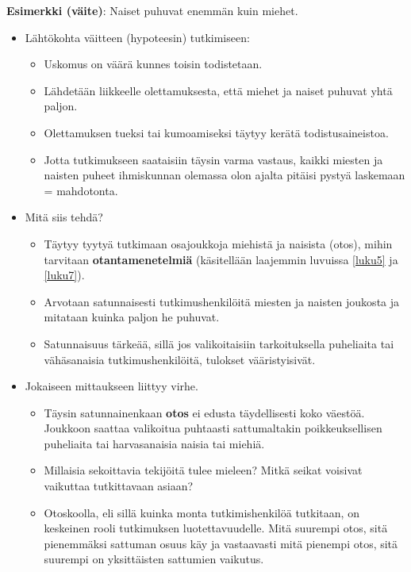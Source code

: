 \documentclass[
]{book}
\providecommand{\tightlist}{%
  \setlength{\itemsep}{0pt}\setlength{\parskip}{0pt}}
\begin{document}
\begin{eblock}{}

\textbf{Esimerkki (väite)}: Naiset puhuvat enemmän kuin miehet.

\begin{itemize}
\tightlist
\item
  Lähtökohta väitteen (hypoteesin) tutkimiseen:

  \begin{itemize}
  \tightlist
  \item
    Uskomus on väärä kunnes toisin todistetaan.
  \item
    Lähdetään liikkeelle olettamuksesta, että miehet ja naiset puhuvat yhtä paljon.
  \item
    Olettamuksen tueksi tai kumoamiseksi täytyy kerätä todistusaineistoa.
  \item
    Jotta tutkimukseen saataisiin täysin varma vastaus, kaikki miesten ja naisten puheet ihmiskunnan olemassa olon ajalta pitäisi pystyä laskemaan = mahdotonta.
  \end{itemize}
\item
  Mitä siis tehdä?

  \begin{itemize}
  \tightlist
  \item
    Täytyy tyytyä tutkimaan osajoukkoja miehistä ja naisista (otos), mihin tarvitaan \textbf{otantamenetelmiä} (käsitellään laajemmin luvuissa \ref{luku5} ja \ref{luku7}).
  \item
    Arvotaan satunnaisesti tutkimushenkilöitä miesten ja naisten joukosta ja mitataan kuinka paljon he puhuvat.
  \item
    Satunnaisuus tärkeää, sillä jos valikoitaisiin tarkoituksella puheliaita tai vähäsanaisia tutkimushenkilöitä, tulokset vääristyisivät.
  \end{itemize}
\item
  Jokaiseen mittaukseen liittyy virhe.

  \begin{itemize}
  \tightlist
  \item
    Täysin satunnainenkaan \textbf{otos} ei edusta täydellisesti koko väestöä. Joukkoon saattaa valikoitua puhtaasti sattumaltakin poikkeuksellisen puheliaita tai harvasanaisia naisia tai miehiä.
  \item
    Millaisia sekoittavia tekijöitä tulee mieleen? Mitkä seikat voisivat vaikuttaa tutkittavaan asiaan?
  \item
    Otoskoolla, eli sillä kuinka monta tutkimishenkilöä tutkitaan, on keskeinen rooli tutkimuksen luotettavuudelle. Mitä suurempi otos, sitä pienemmäksi sattuman osuus käy ja vastaavasti mitä pienempi otos, sitä suurempi on yksittäisten sattumien vaikutus.


\end{itemize}
\end{itemize}
\end{eblock}
\end{document}
